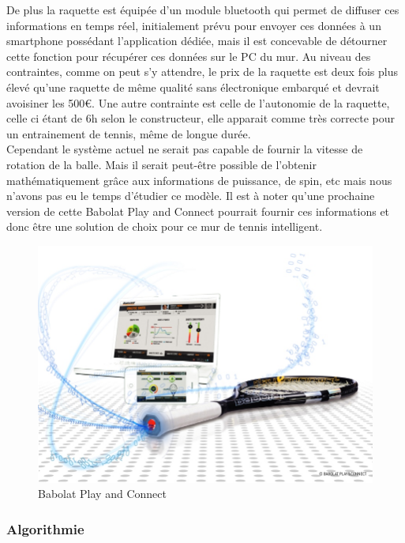 De plus la raquette est équipée d'un module bluetooth qui permet de diffuser ces informations en temps réel, initialement prévu pour envoyer ces données à un smartphone possédant l'application dédiée, mais il est concevable de détourner cette fonction pour récupérer ces données sur le PC du mur. Au niveau des contraintes, comme on peut s'y attendre, le prix de la raquette est deux fois plus élevé qu'une raquette de même qualité sans électronique embarqué et devrait avoisiner les 500€. Une autre contrainte est celle de l'autonomie de la raquette, celle ci étant de 6h selon le constructeur, elle apparait comme très correcte pour un entrainement de tennis, même de longue durée.\\

Cependant le système actuel ne serait pas capable de fournir la vitesse de rotation de la balle. Mais il serait peut-être possible de l'obtenir mathématiquement grâce aux informations de puissance, de spin, etc mais nous n'avons pas eu le temps d'étudier ce modèle. Il est à noter qu'une prochaine version de cette Babolat Play and Connect pourrait fournir ces informations et donc être une solution de choix pour ce mur de tennis intelligent.

\begin{figure}[h]
\begin{center}
\includegraphics[width=\textwidth]{babolatplayandconnect.jpg}
\caption{Babolat Play and Connect}
\label{img_babolatplayandconnect}
\end{center}
\end{figure}


\subsubsection{Algorithmie}



